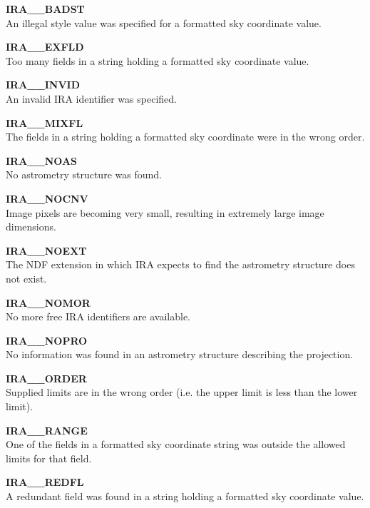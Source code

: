 \begin{description}
\item {\bf IRA\_\_BADST   }\\
An illegal style value was specified for a formatted sky coordinate value.

\item {\bf IRA\_\_EXFLD   }\\
Too many fields in a string holding a formatted sky coordinate value.

\item {\bf IRA\_\_INVID   }\\
An invalid IRA identifier was specified.

\item {\bf IRA\_\_MIXFL   }\\
The fields in a string holding a formatted sky coordinate were in the wrong
order.

\item {\bf IRA\_\_NOAS    }\\
No astrometry structure was found.

\item {\bf IRA\_\_NOCNV   }\\
Image pixels are becoming very small, resulting in extremely large image dimensions.

\item {\bf IRA\_\_NOEXT   }\\
The NDF extension in which IRA expects to find the astrometry structure does
not exist.

\item {\bf IRA\_\_NOMOR   }\\
No more free IRA identifiers are available.

\item {\bf IRA\_\_NOPRO   }\\
No information was found in an astrometry structure describing the projection.

\item {\bf IRA\_\_ORDER   }\\
Supplied limits are in the wrong order (i.e. the upper limit is less than the
lower limit).

\item {\bf IRA\_\_RANGE   }\\
One of the fields in a formatted sky coordinate string was outside the allowed
limits for that field.

\item {\bf IRA\_\_REDFL   }\\
A redundant field was found in a string holding a formatted sky coordinate value.


\end{description}
